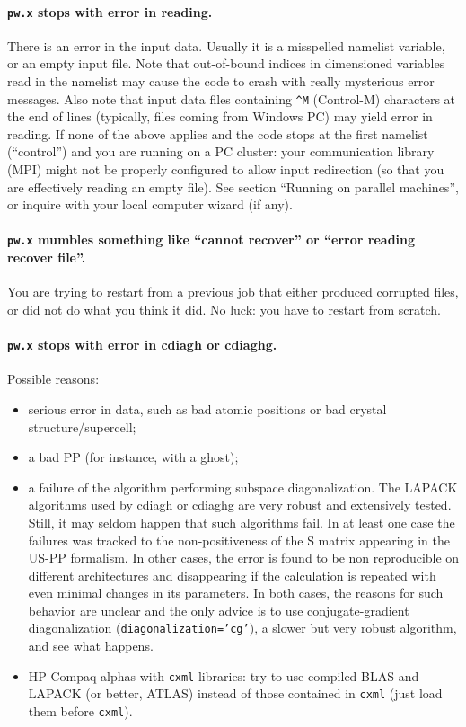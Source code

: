 \documentclass[12pt,a4paper]{article}
\begin{document}
\paragraph{\texttt{pw.x} stops with error in reading.}

There is an error in the input data.
Usually it is a misspelled namelist variable, or an empty input file.
Note that out-of-bound indices in dimensioned variables read in the
namelist may cause the code to crash with really mysterious error
messages.
Also note that input data files containing \texttt{\^{}M} (Control-M)
characters at the end of lines (typically, files coming from Windows
PC) may yield error in reading.
If none of the above applies and the code stops at the first namelist
(``control'')
and you are running on a PC cluster: your communication library
(MPI) might not be properly configured to allow input
redirection (so that you are effectively reading an empty file).
See section ``Running on parallel machines'', or inquire with your 
local computer wizard (if any).

\paragraph{\texttt{pw.x} mumbles something like ``cannot recover'' or
           ``error reading recover file''.}

You are trying to restart from a previous job that either produced 
corrupted files, or did not do what you think it did. No luck:
you have to restart from scratch.

\paragraph{\texttt{pw.x} stops with error in cdiagh or cdiaghg.}

Possible reasons:
\begin{itemize}
  \item
    serious error in data, such as bad atomic positions or bad crystal
    structure/supercell;
  \item
    a bad PP (for instance, with a ghost);
  \item
    a failure of the algorithm performing subspace diagonalization. 
    The LAPACK algorithms used by cdiagh or cdiaghg are very robust 
    and extensively tested. Still, it may seldom happen that such
    algorithms fail. In at least one case the failures was tracked
    to the non-positiveness of the S matrix appearing in the US-PP
    formalism. In other cases, the error is found to be non reproducible
    on different architectures and disappearing if the calculation
    is repeated with even minimal changes in its parameters. 
    In both cases, the reasons for such behavior are unclear and
    the only advice is to use conjugate-gradient diagonalization
    (\texttt{diagonalization='cg'}), a slower but very robust
    algorithm, and see what happens.
  \item
    HP-Compaq alphas with \texttt{cxml} libraries: try to use compiled
    BLAS and LAPACK (or better, ATLAS) instead of those contained in
    \texttt{cxml} (just load them before \texttt{cxml}).
\end{itemize}
\end{document}
